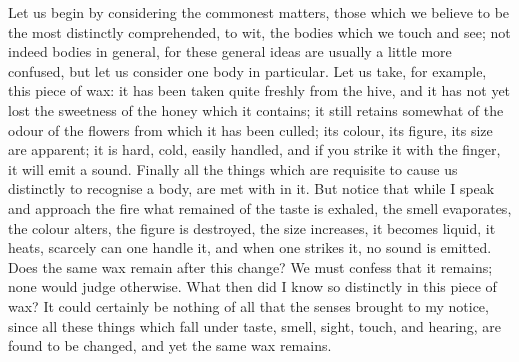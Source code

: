 Let us begin by considering the commonest matters, those which we
believe to be the most distinctly comprehended, to wit, the bodies
which we touch and see; not indeed bodies in general, for these
general ideas are usually a little more confused, but let us consider
one body in particular. Let us take, for example, this piece of wax:
it has been taken quite freshly from the hive, and it has not yet lost
the sweetness of the honey which it contains; it still retains
somewhat of the odour of the flowers from which it has been culled;
its colour, its figure, its size are apparent; it is hard, cold,
easily handled, and if you strike it with the finger, it will emit a
sound. Finally all the things which are requisite to cause us
distinctly to recognise a body, are met with in it. But notice that
while I speak and approach the fire what remained of the taste is
exhaled, the smell evaporates, the colour alters, the figure is
destroyed, the size increases, it becomes liquid, it heats, scarcely
can one handle it, and when one strikes it, no sound is emitted. Does
the same wax remain after this change? We must confess that it
remains; none would judge otherwise. What then did I know so
distinctly in this piece of wax? It could certainly be nothing of all
that the senses brought to my notice, since all these things which
fall under taste, smell, sight, touch, and hearing, are found to be
changed, and yet the same wax remains.

